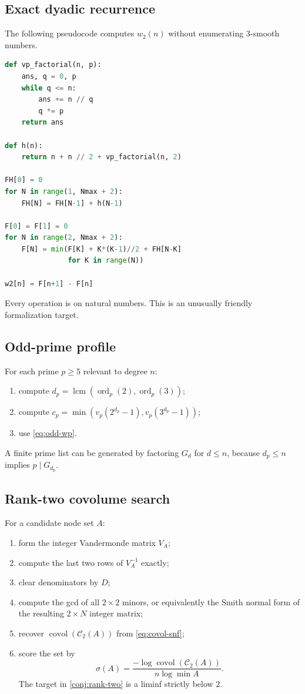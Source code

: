 \documentclass[11pt]{article}
\theoremstyle{definition}
\theoremstyle{remark}
\newcommand{\ord}{\operatorname{ord}}
\newcommand{\lcm}{\operatorname{lcm}}
\newcommand{\covol}{\operatorname{covol}}
\newcommand{\calC}{\mathcal C}
\begin{document}
\subsection{Exact dyadic recurrence}
The following pseudocode computes $w_2(n)$ without enumerating $3$-smooth numbers.
\begin{lstlisting}[language=Python]
def vp_factorial(n, p):
    ans, q = 0, p
    while q <= n:
        ans += n // q
        q *= p
    return ans

def h(n):
    return n + n // 2 + vp_factorial(n, 2)

FH[0] = 0
for N in range(1, Nmax + 2):
    FH[N] = FH[N-1] + h(N-1)

F[0] = F[1] = 0
for N in range(2, Nmax + 2):
    F[N] = min(F[K] + K*(K-1)//2 + FH[N-K]
               for K in range(N))

w2[n] = F[n+1] - F[n]
\end{lstlisting}
Every operation is on natural numbers.  This is an unusually friendly formalization target.

\subsection{Odd-prime profile}
For each prime $p\ge5$ relevant to degree $n$:
\begin{enumerate}
\item compute $d_p=\lcm(\ord_p(2),\ord_p(3))$;
\item compute $c_p=\min(v_p(2^{d_p}-1),v_p(3^{d_p}-1))$;
\item use \eqref{eq:odd-wp}.
\end{enumerate}
A finite prime list can be generated by factoring $G_d$ for $d\le n$, because $d_p\le n$ implies $p\mid G_{d_p}$.

\subsection{Rank-two covolume search}
For a candidate node set $A$:
\begin{enumerate}
\item form the integer Vandermonde matrix $V_A$;
\item compute the last two rows of $V_A^{-1}$ exactly;
\item clear denominators by $D$;
\item compute the gcd of all $2\times2$ minors, or equivalently the Smith normal form of the resulting $2\times N$ integer matrix;
\item recover $\covol(\calC_2(A))$ from \eqref{eq:covol-snf};
\item score the set by
\[
  \sigma(A)=\frac{-\log\covol(\calC_2(A))}{n\log\min A}.
\]
The target in \cref{conj:rank-two} is a liminf strictly below $2$.
\end{enumerate}
\end{document}
